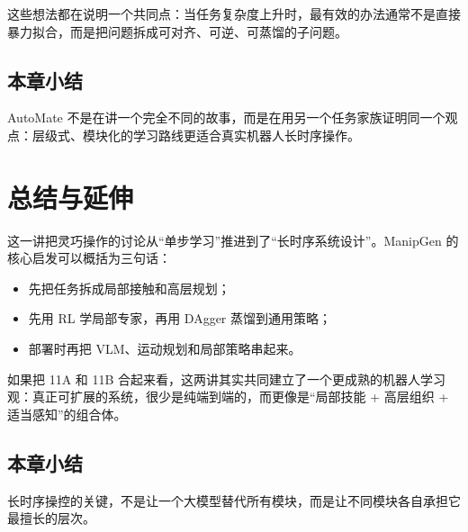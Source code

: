 \documentclass[a4paper]{article}
\begin{document}
这些想法都在说明一个共同点：当任务复杂度上升时，最有效的办法通常不是直接暴力拟合，而是把问题拆成可对齐、可逆、可蒸馏的子问题。

\subsection{本章小结}

AutoMate 不是在讲一个完全不同的故事，而是在用另一个任务家族证明同一个观点：层级式、模块化的学习路线更适合真实机器人长时序操作。

\section{总结与延伸}

这一讲把灵巧操作的讨论从“单步学习”推进到了“长时序系统设计”。ManipGen 的核心启发可以概括为三句话：
\begin{itemize}
  \item 先把任务拆成局部接触和高层规划；
  \item 先用 RL 学局部专家，再用 DAgger 蒸馏到通用策略；
  \item 部署时再把 VLM、运动规划和局部策略串起来。
\end{itemize}

如果把 11A 和 11B 合起来看，这两讲其实共同建立了一个更成熟的机器人学习观：真正可扩展的系统，很少是纯端到端的，而更像是“局部技能 + 高层组织 + 适当感知”的组合体。

\subsection{本章小结}

长时序操控的关键，不是让一个大模型替代所有模块，而是让不同模块各自承担它最擅长的层次。
\end{document}
